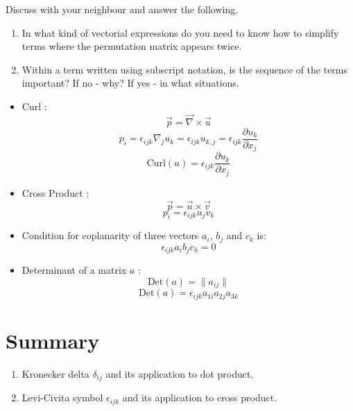 Discuss with your neighbour and answer the following.


\begin{enumerate}
\item In what kind of vectorial expressions do you need to know how to simplify terms where the permutation matrix appears twice.

\item Within a term written using subscript notation, is the sequence of the terms important? If no - why? If yes - in what situations.

\end{enumerate}

\begin{itemize}

\item Curl :
$$ \vec{p} = \vec{\nabla}\times\vec{u}$$
$$ p_i = \epsilon_{ijk} \nabla_j u_k = \epsilon_{ijk} u_{k,j} = \epsilon_{ijk} \frac{\partial u_k}{\partial x_j}$$
$$\boxed{ \text{Curl}(u) = \epsilon_{ijk} \frac{\partial u_k}{\partial x_j} }$$

\item Cross Product : 
$$ \vec{p} = \vec{u}\times\vec{v}$$
$$ \boxed{p_i = \epsilon_{ijk} u_j v_k }$$

\item Condition for coplanarity of three vectors $a_i$, $b_j$ and $c_k$ is:
$$ \epsilon_{ijk} a_i b_j c_k = 0 $$
\item Determinant of a matrix $a$ : 
$$\text{Det}(a) = \| a_{ij} \|$$
$$ \boxed{\text{Det}(a) = \epsilon_{ijk}a_{1i}a_{2j}a_{3k}} $$

\end{itemize}


\section{Summary}
\begin{enumerate}
\item Kronecker delta $\delta_{ij}$ and its application to dot product.
\item Levi-Civita symbol $\epsilon_{ijk}$ and its application to cross product.
\end{enumerate}



